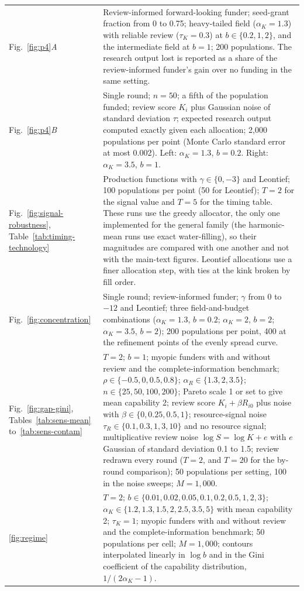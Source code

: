 \begin{table}[tp]
\begin{tabular}{@{}p{2.3cm}p{10.0cm}@{}}
Fig.~\ref{fig:p4}\textit{A} & Review-informed forward-looking funder; seed-grant fraction from 0 to 0.75; heavy-tailed field ($\alpha_K = 1.3$) with reliable review ($\tau_K = 0.3$) at $b \in \{0.2, 1, 2\}$, and the intermediate field at $b = 1$; 200 populations. The research output lost is reported as a share of the review-informed funder's gain over no funding in the same setting. \\
Fig.~\ref{fig:p4}\textit{B} & Single round; $n = 50$; a fifth of the population funded; review score $K_i$ plus Gaussian noise of standard deviation $\tau$; expected research output computed exactly given each allocation; 2{,}000 populations per point (Monte Carlo standard error at most 0.002). Left: $\alpha_K = 1.3$, $b = 0.2$. Right: $\alpha_K = 3.5$, $b = 1$. \\
Fig.~\ref{fig:signal-robustness}, Table~\ref{tab:timing-technology} & Production functions with $\gamma \in \{0, -3\}$ and Leontief; 100 populations per point (50 for Leontief); $T = 2$ for the signal value and $T = 5$ for the timing table. These runs use the greedy allocator, the only one implemented for the general family (the harmonic-mean runs use exact water-filling), so their magnitudes are compared with one another and not with the main-text figures. Leontief allocations use a finer allocation step, with ties at the kink broken by fill order. \\
Fig.~\ref{fig:concentration} & Single round; review-informed funder; $\gamma$ from 0 to $-12$ and Leontief; three field-and-budget combinations ($\alpha_K = 1.3$, $b = 0.2$; $\alpha_K = 2$, $b = 2$; $\alpha_K = 3.5$, $b = 2$); 200 populations per point, 400 at the refinement points of the evenly spread curve. \\
Fig.~\ref{fig:gap-gini}, Tables~\ref{tab:sens-mean} to~\ref{tab:sens-contam} & $T = 2$; $b = 1$; myopic funders with and without review and the complete-information benchmark; $\rho \in \{-0.5, 0, 0.5, 0.8\}$; $\alpha_R \in \{1.3, 2, 3.5\}$; $n \in \{25, 50, 100, 200\}$; Pareto scale 1 or set to give mean capability 2; review score $K_i + \beta R_{i0}$ plus noise with $\beta \in \{0, 0.25, 0.5, 1\}$; resource-signal noise $\tau_R \in \{0.1, 0.3, 1, 3, 10\}$ and no resource signal; multiplicative review noise $\log S = \log K + e$ with $e$ Gaussian of standard deviation 0.1 to 1.5; review redrawn every round ($T = 2$, and $T = 20$ for the by-round comparison); 50 populations per setting, 100 in the noise sweeps; $M = 1{,}000$. \\
\ref{fig:regime} & $T = 2$; $b \in \{0.01, 0.02, 0.05, 0.1, 0.2, 0.5, 1, 2, 3\}$; $\alpha_K \in \{1.2, 1.3, 1.5, 2, 2.5, 3.5, 5\}$ with mean capability 2; $\tau_K = 1$; myopic funders with and without review and the complete-information benchmark; 50 populations per cell; $M = 1{,}000$; contours interpolated linearly in $\log b$ and in the Gini coefficient of the capability distribution, $1/(2\alpha_K - 1)$. \\

\end{tabular}
\end{table}
